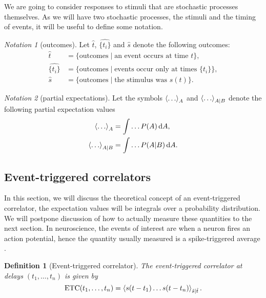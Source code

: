 \documentclass[12pt]{article}
\theoremstyle{slplain}
\theoremstyle{sldefinition}
\newtheorem{defn}{Definition}
\theoremstyle{remark}
\newtheorem*{notn}{Notation}
\DeclareMathOperator{\ETC}{ETC}
\begin{document}
We are going to consider responses to stimuli that are stochastic processes themselves. As we will have two stochastic processes, the stimuli and the timing of events, it will be useful to define some notation.

\begin{notn}[outcomes]
  Let $\hat{t}$, $\widehat{\{t_i\}}$ and $\hat{s}$ denote the following outcomes:
  \begin{equation}\label{eq:outcomes}
    \begin{aligned}
      \hat{t} &= \{ \text{outcomes} \mid \text{an event occurs at time } t  \} , \\
      \widehat{\{t_i\}} &= \{ \text{outcomes} \mid \text{events occur only at times } \{t_i\}  \} , \\
      \hat{s} &= \{ \text{outcomes} \mid \text{the stimulus was } s(t)  \} .
    \end{aligned}
  \end{equation}
\end{notn}

\begin{notn}[partial expectations]
  Let the symbols $\left\langle \ldots \right\rangle_A$ and $\left\langle \ldots \right\rangle_{A|B}$ denote the following partial expectation values
  \begin{equation}\label{eq:partialexp}
    \begin{aligned}
      \left\langle \ldots \right\rangle_A &= \int\ldots P(A)\,\mathrm{d} A, \\
      \left\langle \ldots \right\rangle_{A|B} &= \int\ldots P(A|B)\,\mathrm{d} A.
    \end{aligned}
  \end{equation}
\end{notn}

\subsection{Event-triggered correlators}\label{sec:evtrigcorr}

In this section, we will discuss the theoretical concept of an event-triggered correlator, \ie the expectation values will be integrals over a probability distribution. We will postpone discussion of how to actually measure these quantities to the next section. In neuroscience, the events of interest are when a neuron fires an action potential, hence the quantity usually measured is a spike-triggered average \cite{DayanAbbot:2001,deBoerKuyper:1968}.

\begin{defn}[Event-triggered correlator]
  The event-triggered correlator at delays $(t_1,\ldots,t_n)$ is given by
  \begin{equation}\label{eq:evtrigcorr}
    \ETC(t_1,\ldots,t_n) = \av{s(t-t_1)\ldots s(t-t_n)}_{\hat{s}|\hat{t}}.
  \end{equation}
\end{defn}
\end{document}
